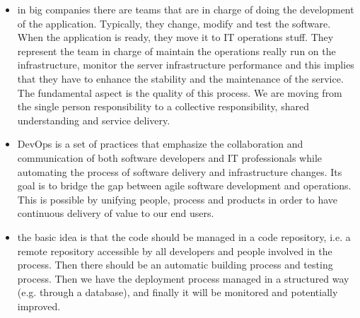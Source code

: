 \documentclass[11pt]{article}
\begin{document}
\begin{itemize}
\item in big companies there are teams that are in charge of doing the development of the application. Typically, they change, modify and test the software. When the application is ready, they move it to IT operations stuff. They represent the team in charge of maintain the operations really run on the infrastructure, monitor the server infrastructure performance and this implies that they have to enhance the stability and the maintenance of the service. The fundamental aspect is the quality of this process. We are moving from the single person responsibility to a collective responsibility, shared understanding and service delivery.
\item DevOps is a set of practices that emphasize the collaboration and communication of both software developers and IT professionals while automating the process of software delivery and infrastructure changes. Its goal is to bridge the gap between agile software development and operations. This is possible by unifying people, process and products in order to have continuous delivery of value to our end users.
\item the basic idea is that the code should be managed in a code repository, i.e. a remote repository accessible by all developers and people involved in the process. Then there should be an automatic building process and testing process. Then we have the deployment process managed in a structured way (e.g. through a database), and finally it will be monitored and potentially improved.
\end{itemize}
\end{document}
